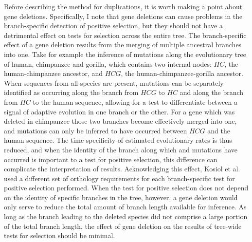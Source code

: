 Before describing the method for duplications, it is worth making a
point about gene deletions. Specifically, I note that gene deletions
can cause problems in the branch-specific detection of positive
selection, but they should not have a detrimental effect on tests for
selection across the entire tree. The branch-specific effect of a gene
deletion results from the merging of multiple ancestral branches into
one. Take for example the inference of mutations along the
evolutionary tree of human, chimpanzee and gorilla, which contains two
internal nodes: $HC$, the human-chimpanzee ancestor, and $HCG$, the
human-chimpanzee-gorilla ancestor. When sequences from all species are
present, mutations can be separately identified as occurring along the
branch from $HCG$ to $HC$ and along the branch from $HC$ to the human
sequence, allowing for a test to differentiate between a signal of
adaptive evolution in one branch or the other. For a gene which was
deleted in chimpanzee those two branches become effectively merged
into one, and mutations can only be inferred to have occurred between
$HCG$ and the human sequence. The time-specificity of estimated
evolutionary rates is thus reduced, and when the identity of the
branch along which \syn and \nsyn mutations have occurred is important
to a test for positive selection, this difference can complicate the
interpretation of results. Acknowledging this effect, Kosiol et
al. \citeyearpar{Kosiol2008} used a different set of orthology
requirements for each branch-specific test for positive selection
performed. When the test for positive selection does not depend on the
identity of specific branches in the tree, however, a gene deletion
would only serve to reduce the total amount of branch length available
for inference. As long as the branch leading to the deleted species
did not comprise a large portion of the total branch length, the
effect of gene deletion on the results of tree-wide tests for
selection should be minimal.

